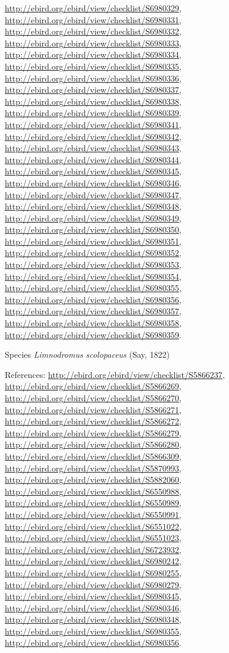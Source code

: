 \documentclass[9pt, article]{memoir}
\begin{document}
\begin{multicols}{2}
\url{http://ebird.org/ebird/view/checklist/S6980329}, 
\url{http://ebird.org/ebird/view/checklist/S6980331}, 
\url{http://ebird.org/ebird/view/checklist/S6980332}, 
\url{http://ebird.org/ebird/view/checklist/S6980333}, 
\url{http://ebird.org/ebird/view/checklist/S6980334}, 
\url{http://ebird.org/ebird/view/checklist/S6980335}, 
\url{http://ebird.org/ebird/view/checklist/S6980336}, 
\url{http://ebird.org/ebird/view/checklist/S6980337}, 
\url{http://ebird.org/ebird/view/checklist/S6980338}, 
\url{http://ebird.org/ebird/view/checklist/S6980339}, 
\url{http://ebird.org/ebird/view/checklist/S6980341}, 
\url{http://ebird.org/ebird/view/checklist/S6980342}, 
\url{http://ebird.org/ebird/view/checklist/S6980343}, 
\url{http://ebird.org/ebird/view/checklist/S6980344}, 
\url{http://ebird.org/ebird/view/checklist/S6980345}, 
\url{http://ebird.org/ebird/view/checklist/S6980346}, 
\url{http://ebird.org/ebird/view/checklist/S6980347}, 
\url{http://ebird.org/ebird/view/checklist/S6980348}, 
\url{http://ebird.org/ebird/view/checklist/S6980349}, 
\url{http://ebird.org/ebird/view/checklist/S6980350}, 
\url{http://ebird.org/ebird/view/checklist/S6980351}, 
\url{http://ebird.org/ebird/view/checklist/S6980352}, 
\url{http://ebird.org/ebird/view/checklist/S6980353}, 
\url{http://ebird.org/ebird/view/checklist/S6980354}, 
\url{http://ebird.org/ebird/view/checklist/S6980355}, 
\url{http://ebird.org/ebird/view/checklist/S6980356}, 
\url{http://ebird.org/ebird/view/checklist/S6980357}, 
\url{http://ebird.org/ebird/view/checklist/S6980358}, 
\url{http://ebird.org/ebird/view/checklist/S6980359}.

\vspace{6pt}\noindent\hspace{36pt}Species \textit{Limnodromus scolopaceus} (Say, 1822)


\vspace{6pt}References: 
\url{http://ebird.org/ebird/view/checklist/S5866237}, 
\url{http://ebird.org/ebird/view/checklist/S5866269}, 
\url{http://ebird.org/ebird/view/checklist/S5866270}, 
\url{http://ebird.org/ebird/view/checklist/S5866271}, 
\url{http://ebird.org/ebird/view/checklist/S5866272}, 
\url{http://ebird.org/ebird/view/checklist/S5866279}, 
\url{http://ebird.org/ebird/view/checklist/S5866280}, 
\url{http://ebird.org/ebird/view/checklist/S5866309}, 
\url{http://ebird.org/ebird/view/checklist/S5870993}, 
\url{http://ebird.org/ebird/view/checklist/S5882060}, 
\url{http://ebird.org/ebird/view/checklist/S6550988}, 
\url{http://ebird.org/ebird/view/checklist/S6550989}, 
\url{http://ebird.org/ebird/view/checklist/S6550991}, 
\url{http://ebird.org/ebird/view/checklist/S6551022}, 
\url{http://ebird.org/ebird/view/checklist/S6551023}, 
\url{http://ebird.org/ebird/view/checklist/S6723932}, 
\url{http://ebird.org/ebird/view/checklist/S6980242}, 
\url{http://ebird.org/ebird/view/checklist/S6980255}, 
\url{http://ebird.org/ebird/view/checklist/S6980279}, 
\url{http://ebird.org/ebird/view/checklist/S6980345}, 
\url{http://ebird.org/ebird/view/checklist/S6980346}, 
\url{http://ebird.org/ebird/view/checklist/S6980348}, 
\url{http://ebird.org/ebird/view/checklist/S6980355}, 
\url{http://ebird.org/ebird/view/checklist/S6980356}.


\end{multicols}
\end{document}
